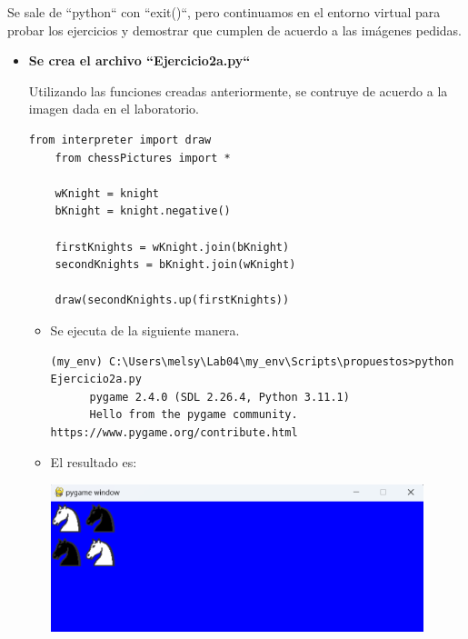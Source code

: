 \documentclass{article}
\begin{document}
  \vspace{\baselineskip}

  Se sale de ``python`` con ``exit()``, pero continuamos en el entorno virtual para probar los ejercicios y demostrar que cumplen de acuerdo a las imágenes pedidas.

  \vspace{\baselineskip}

  \begin{itemize}
  \item \textbf{Se crea el archivo ``Ejercicio2a.py``}
  
  \vspace{\baselineskip}
  
  Utilizando las funciones creadas anteriormente, se contruye de acuerdo a la imagen dada en el laboratorio.

    \begin{lstlisting}[style=python]
    from interpreter import draw
    from chessPictures import *

    wKnight = knight
    bKnight = knight.negative()

    firstKnights = wKnight.join(bKnight)
    secondKnights = bKnight.join(wKnight)

    draw(secondKnights.up(firstKnights))
    \end{lstlisting}

    \vspace{\baselineskip}

    \begin{itemize}
      \item Se ejecuta de la siguiente manera.

      \begin{lstlisting}[style=shell]
      (my_env) C:\Users\melsy\Lab04\my_env\Scripts\propuestos>python Ejercicio2a.py
      pygame 2.4.0 (SDL 2.26.4, Python 3.11.1)
      Hello from the pygame community. https://www.pygame.org/contribute.html
      \end{lstlisting}

      \vspace{2\baselineskip}

      \item El resultado es:
      
      \vspace{\baselineskip}

      \begin{minipage}{\linewidth}
        \centering
        \includegraphics[width=0.9\textwidth]{imagenes/p_ej2a.png}
      \end{minipage}
    \end{itemize}
  

\end{itemize}
\end{document}
